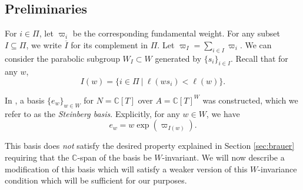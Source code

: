 \documentclass{amsart}
\newtheorem{prop}[thm]{Proposition}
\theoremstyle{definition}
\newcommand{\Ce}{\mathbb{C}}
\begin{document}
\subsection{Preliminaries}\label{sec:klsbprelim}

For $i \in \Pi$, let $\varpi_i$ be the corresponding fundamental weight. For any subset $I\subseteq \Pi$, we write $\overline{I}$ for its complement in $\Pi$. Let $\varpi_I=\sum_{i\in I}\varpi_i$. We can consider the parabolic subgroup $W_I \subset W$ generated by $\{s_i\}_{i \in I}$. Recall that for any $w$, 
\[I(w) = \{i \in \Pi~|~\ell(ws_i) < \ell(w)\}.\]

In \cite{St}, a basis $\{e_w\}_{w \in W}$ for $N = \mathbb{C}[T]$ over $A = \mathbb{C}[T]^W$ was constructed, which we refer to as the \emph{Steinberg basis}. Explicitly, for any $w \in W$, we have
\begin{equation*}
    e_w = w \exp(\varpi_{I(w)}).
\end{equation*}

This basis does {\em not} satisfy the desired property explained in Section \ref{sec:brauer} requiring that the $\mathbb{C}$-span of the basis be $W$-invariant. We will now describe a modification of this basis which will satisfy a weaker version of this $W$-invariance condition which will be sufficient for our purposes.

\end{document}
